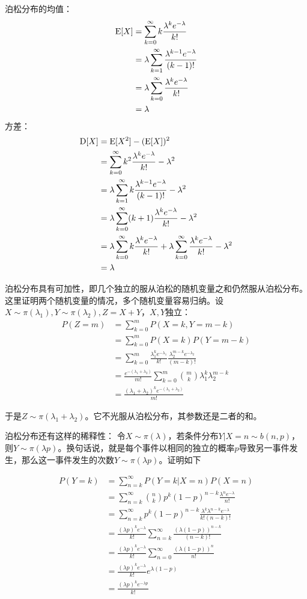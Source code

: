泊松分布的均值：
\begin{align*}
\operatorname{E}[X]&=\sum_{k=0}^{\infty}k\frac{\lambda^k e^{-\lambda}}{k!}\\
&=\lambda\sum_{k=1}^{\infty}\frac{\lambda^{k-1} e^{-\lambda}}{(k-1)!}\\
&=\lambda\sum_{k=0}^{\infty}\frac{\lambda^{k} e^{-\lambda}}{k!}\\
&=\lambda
\end{align*}
方差：
\begin{align*}
\operatorname{D}[X]&=\operatorname{E}[X^2]-(\operatorname{E}[X])^2 \\
&= \sum_{k=0}^{\infty}k^2\frac{\lambda^k e^{-\lambda}}{k!}-\lambda^2\\
&= \lambda\sum_{k=1}^{\infty}k\frac{\lambda^{k-1} e^{-\lambda}}{(k-1)!}-\lambda^2\\
&= \lambda\sum_{k=0}^{\infty}(k+1)\frac{\lambda^{k} e^{-\lambda}}{k!}-\lambda^2\\
&= \lambda\sum_{k=0}^{\infty}k\frac{\lambda^{k} e^{-\lambda}}{k!} + \lambda\sum_{k=0}^{\infty}\frac{\lambda^{k} e^{-\lambda}}{k!} -\lambda^2\\
&= \lambda
\end{align*}

泊松分布具有可加性，即几个独立的服从泊松的随机变量之和仍然服从泊松分布。这里证明两个随机变量的情况，多个随机变量容易归纳。设$X\sim \pi(\lambda_1),Y\sim \pi(\lambda_2),Z=X+Y$，$X,Y$独立：
\begin{align*}
P(Z=m)&=\sum_{k=0}^mP(X=k,Y=m-k)\\
&=\sum_{k=0}^mP(X=k)P(Y=m-k)\\
&=\sum_{k=0}^m\frac{\lambda_1^ke^{-\lambda_1}}{k!}\frac{\lambda_2^{m-k}e^{-\lambda_2}}{(m-k)!}\\
&=\frac{e^{-(\lambda_1+\lambda_2)}}{m!}\sum_{k=0}^m\binom{m}{k}\lambda_1^k\lambda_2^{m-k}\\
&=\frac{(\lambda_1+\lambda_2)^ke^{-(\lambda_1+\lambda_2)}}{m!}
\end{align*}

于是$Z\sim \pi(\lambda_1+\lambda_2)$。它不光服从泊松分布，其参数还是二者的和。

泊松分布还有这样的稀释性：
令$X\sim\pi(\lambda)$，若条件分布$Y|X=n\sim b(n,p)$，则$Y\sim \pi(\lambda p)$。换句话说，就是每个事件以相同的独立的概率$p$导致另一事件发生，那么这一事件发生的次数$Y\sim \pi(\lambda p)$。证明如下

\begin{align*}
P(Y=k)&=\sum_{n=k}^{\infty}P(Y=k|X=n)P(X=n) \\
&=\sum_{n=k}^{\infty}\binom{n}{k}p^k(1-p)^{n-k}\frac{\lambda^ne^{-\lambda}}{n!} \\
&=\sum_{n=k}^{\infty}p^k(1-p)^{n-k}\frac{\lambda^k\lambda^{n-k}e^{-\lambda}}{k!(n-k)!} \\
&=\frac{(\lambda p)^ke^{-\lambda}}{k!}\sum_{n=k}^{\infty}\frac{(\lambda(1-p))^{n-k}}{(n-k)!} \\
&=\frac{(\lambda p)^ke^{-\lambda}}{k!}\sum_{n=0}^{\infty}\frac{(\lambda(1-p))^{n}}{n!} \\
&=\frac{(\lambda p)^ke^{-\lambda}}{k!}e^{\lambda(1-p)} \\
&=\frac{(\lambda p)^ke^{-\lambda p}}{k!} \\
\end{align*}

